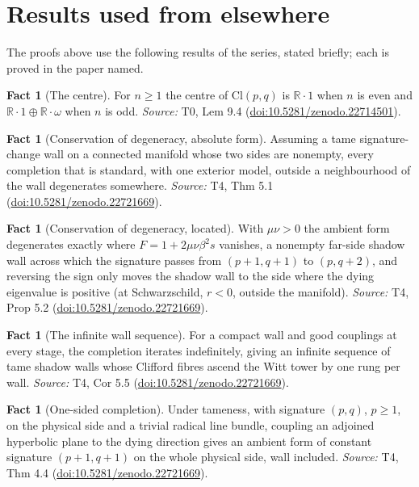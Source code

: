 \documentclass[11pt]{article}
\theoremstyle{definition}
\newtheorem{fact}[theorem]{Fact}
\theoremstyle{plain}
\providecommand{\Cl}{}\renewcommand{\Cl}{\mathrm{Cl}}
\providecommand{\R}{}\renewcommand{\R}{\mathbb{R}}
\begin{document}
\section{Results used from elsewhere}
The proofs above use the following results of the series, stated briefly; each is proved in the paper named.

\begin{fact}[The centre]\label{c:primer.centre}
For $n \geq 1$ the centre of $\Cl(p,q)$ is $\R \cdot 1$ when $n$ is even and $\R \cdot 1 \oplus \R \cdot \omega$ when $n$ is odd.
\emph{Source:} T0, Lem 9.4 (\href{https://doi.org/10.5281/zenodo.22714501}{doi:10.5281/zenodo.22714501}).
\end{fact}

\begin{fact}[Conservation of degeneracy, absolute form]\label{c:sheaf.conservation-degeneracy-absolute-form}
Assuming a tame signature-change wall on a connected manifold whose two sides are nonempty, every completion that is standard, with one exterior model, outside a neighbourhood of the wall degenerates somewhere.
\emph{Source:} T4, Thm 5.1 (\href{https://doi.org/10.5281/zenodo.22721669}{doi:10.5281/zenodo.22721669}).
\end{fact}

\begin{fact}[Conservation of degeneracy, located]\label{c:sheaf.conservation-degeneracy-located}
With $\mu\nu > 0$ the ambient form degenerates exactly where $F = 1 + 2\mu\nu\beta^2 s$ vanishes, a nonempty far-side shadow wall across which the signature passes from $(p+1,q+1)$ to $(p,q+2)$, and reversing the sign only moves the shadow wall to the side where the dying eigenvalue is positive (at Schwarzschild, $r < 0$, outside the manifold).
\emph{Source:} T4, Prop 5.2 (\href{https://doi.org/10.5281/zenodo.22721669}{doi:10.5281/zenodo.22721669}).
\end{fact}

\begin{fact}[The infinite wall sequence]\label{c:sheaf.infinite-wall-sequence}
For a compact wall and good couplings at every stage, the completion iterates indefinitely, giving an infinite sequence of tame shadow walls whose Clifford fibres ascend the Witt tower by one rung per wall.
\emph{Source:} T4, Cor 5.5 (\href{https://doi.org/10.5281/zenodo.22721669}{doi:10.5281/zenodo.22721669}).
\end{fact}

\begin{fact}[One-sided completion]\label{c:sheaf.one-sided-completion}
Under tameness, with signature $(p,q)$, $p \geq 1$, on the physical side and a trivial radical line bundle, coupling an adjoined hyperbolic plane to the dying direction gives an ambient form of constant signature $(p{+}1, q{+}1)$ on the whole physical side, wall included.
\emph{Source:} T4, Thm 4.4 (\href{https://doi.org/10.5281/zenodo.22721669}{doi:10.5281/zenodo.22721669}).
\end{fact}
\end{document}
